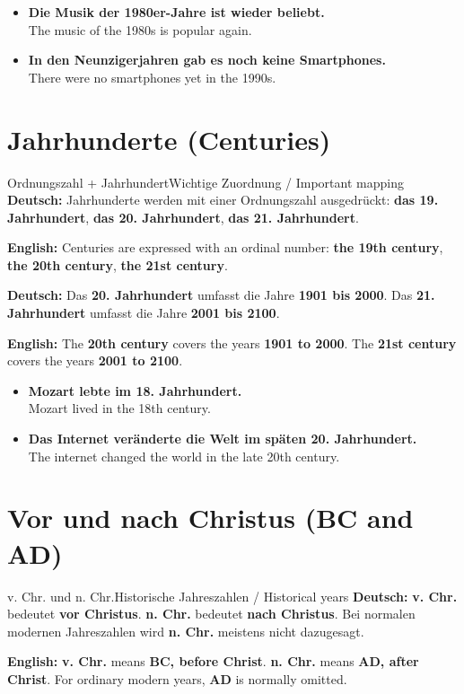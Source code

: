 \documentclass[a4paper,11pt]{article}
\newcommand{\GermanText}[1]{\textbf{Deutsch: }#1\par}
\newcommand{\EnglishText}[1]{{\small\color{SoftGray}\textbf{English: }#1\par}}
\newcommand{\ExampleItem}[2]{\item \textbf{#1}\\{\small\color{SoftGray}#2}}
\begin{document}
\begin{exbox}
\begin{itemize}
\ExampleItem{Die Musik der 1980er-Jahre ist wieder beliebt.}{The music of the 1980s is popular again.}
\ExampleItem{In den Neunzigerjahren gab es noch keine Smartphones.}{There were no smartphones yet in the 1990s.}
\end{itemize}
\end{exbox}

\section{Jahrhunderte \textnormal{(Centuries)}}

\begin{grammarentry}{Ordnungszahl + Jahrhundert}{Wichtige Zuordnung / Important mapping}
\GermanText{Jahrhunderte werden mit einer Ordnungszahl ausgedrückt: \textbf{das 19. Jahrhundert}, \textbf{das 20. Jahrhundert}, \textbf{das 21. Jahrhundert}.}
\EnglishText{Centuries are expressed with an ordinal number: \textbf{the 19th century}, \textbf{the 20th century}, \textbf{the 21st century}.}

\GermanText{Das \textbf{20. Jahrhundert} umfasst die Jahre \textbf{1901 bis 2000}. Das \textbf{21. Jahrhundert} umfasst die Jahre \textbf{2001 bis 2100}.}
\EnglishText{The \textbf{20th century} covers the years \textbf{1901 to 2000}. The \textbf{21st century} covers the years \textbf{2001 to 2100}.}
\end{grammarentry}

\begin{exbox}
\begin{itemize}
\ExampleItem{Mozart lebte im 18. Jahrhundert.}{Mozart lived in the 18th century.}
\ExampleItem{Das Internet veränderte die Welt im späten 20. Jahrhundert.}{The internet changed the world in the late 20th century.}
\end{itemize}
\end{exbox}

\section{Vor und nach Christus \textnormal{(BC and AD)}}

\begin{grammarentry}{v. Chr. und n. Chr.}{Historische Jahreszahlen / Historical years}
\GermanText{\textbf{v. Chr.} bedeutet \textbf{vor Christus}. \textbf{n. Chr.} bedeutet \textbf{nach Christus}. Bei normalen modernen Jahreszahlen wird \textbf{n. Chr.} meistens nicht dazugesagt.}
\EnglishText{\textbf{v. Chr.} means \textbf{BC, before Christ}. \textbf{n. Chr.} means \textbf{AD, after Christ}. For ordinary modern years, \textbf{AD} is normally omitted.}
\end{grammarentry}
\end{document}
